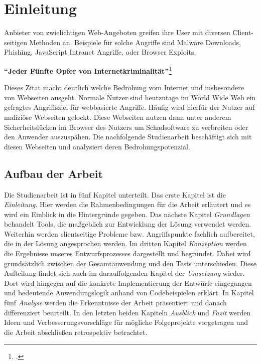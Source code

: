 \chapter{Einleitung}

Anbieter von zwielichtigen Web-Angeboten greifen ihre User mit diversen Client-seitigen Methoden an. Beispiele für solche Angriffe sind Malware Downloads, Phishing, JavaScript Intranet Angriffe, oder Browser Exploits.

\begin{center}
\textbf{\enquote{Jeder Fünfte Opfer von Internetkriminalität}}\footcite[Zitat][297]{cybercrime}
\end{center}

Dieses Zitat macht deutlich welche Bedrohung vom Internet und insbesondere von Webseiten ausgeht. Normale Nutzer sind heutzutage im World Wide Web ein gefragtes Angriffsziel für webbasierte Angriffe. Häufig wird hierfür der Nutzer auf maliziöse Webseiten gelockt. Diese Webseiten nutzen dann unter anderem Sicherheitslücken im Browser des Nutzers um Schadsoftware zu verbreiten oder den Anwender auszuspähen. Die nachfolgende Studienarbeit beschäftigt sich mit diesen Webseiten und analysiert deren Bedrohungspotenzial.

\section{Aufbau der Arbeit}

Die Studienarbeit ist in fünf Kapitel unterteilt.
Das erste Kapitel ist die \textit{Einleitung}. Hier werden die Rahmenbedingungen für die Arbeit erläutert und es wird ein Einblick in die Hintergründe gegeben.
Das nächste Kapitel \textit{Grundlagen} behandelt Tools, die maßgeblich zur Entwicklung der Lösung verwendet werden.
Weiterhin werden clientseitige Probleme bzw. Angriffspunkte fachlich aufbereitet, die in der Lösung angesprochen werden.
Im dritten Kapitel \textit{Konzeption} werden die Ergebnisse unseres Entwurfsprozesses dargestellt und begründet.
Dabei wird grundsätzlich zwischen der Gesamtanwendung und den Tests unterschieden.
Diese Aufteilung findet sich auch im darauffolgenden Kapitel der \textit{Umsetzung} wieder.
Dort wird hingegen auf die konkrete Implementierung der Entwürfe eingegangen und bedeutende Anwendungslogik anhand von Codebeispielen erklärt.
In Kapitel fünf \textit{Analyse} werden die Erkenntnisse der Arbeit präsentiert und danach differenziert beurteilt.
In den letzten beiden Kapiteln \textit{Ausblick} und \textit{Fazit} werden Ideen und Verbesserungsvorschläge für mögliche Folgeprojekte vorgetragen und die Arbeit abschließen retrospektiv betrachtet.

